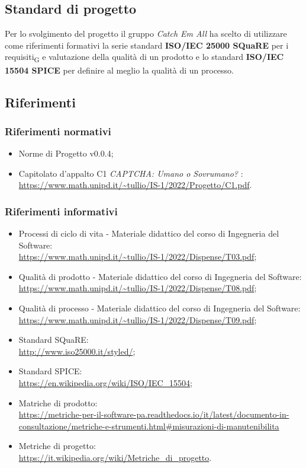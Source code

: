 \subsection{Standard di progetto}
Per lo svolgimento del progetto il gruppo \textit{Catch Em All} ha scelto di utilizzare come riferimenti formativi la serie standard \textbf{ISO/IEC 25000 SQuaRE} per i requisiti\textsubscript{G} e valutazione della qualità di un prodotto e lo standard \textbf{ISO/IEC 15504 SPICE} per definire al meglio la qualità di un processo.

\subsection{Riferimenti}
\subsubsection{Riferimenti normativi}\:
\begin{itemize}
	\item Norme di Progetto v0.0.4;
	\item Capitolato d'appalto C1 \textit{CAPTCHA: Umano o Sovrumano?} : \\
		\url{https://www.math.unipd.it/~tullio/IS-1/2022/Progetto/C1.pdf}.
\end{itemize}
	
\subsubsection{Riferimenti informativi}\:
\begin{itemize}
	\item Processi di ciclo di vita - Materiale didattico del corso di Ingegneria del Software: \\
		\url{https://www.math.unipd.it/~tullio/IS-1/2022/Dispense/T03.pdf};
	\item Qualità di prodotto - Materiale didattico del corso di Ingegneria del Software: \\
		\url{https://www.math.unipd.it/~tullio/IS-1/2022/Dispense/T08.pdf};
	\item Qualità di processo - Materiale didattico del corso di Ingegneria del Software: \\
		\url{https://www.math.unipd.it/~tullio/IS-1/2022/Dispense/T09.pdf};
	\item Standard SQuaRE: \\
		\url{http://www.iso25000.it/styled/};
	\item Standard SPICE: \\
		\url{https://en.wikipedia.org/wiki/ISO/IEC_15504};
	\item Matriche di prodotto: \\
		\url{https://metriche-per-il-software-pa.readthedocs.io/it/latest/documento-in-consultazione/metriche-e-strumenti.html#misurazioni-di-manutenibilita}
	\item Metriche di progetto: \\
		\url{https://it.wikipedia.org/wiki/Metriche_di_progetto}.
\end{itemize}

